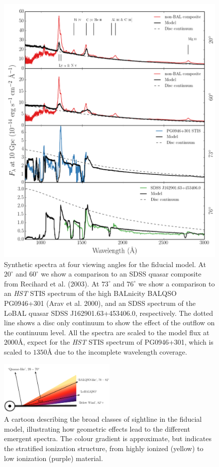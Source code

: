 \documentclass[useAMS,usenatbib]{mn2e_x}
\begin{document}
\begin{figure}
\centering
\includegraphics[width=1.0\textwidth]{figures/uvspec_new.png}
\caption
{
Synthetic spectra at four viewing angles for the fiducial model. At 
$20^\circ$ and $60^\circ$ we show a comparison to an SDSS quasar composite
from Recihard et al. (2003). At $73^\circ$ and $76^\circ$ we show a comparison to
an {\sl HST} STIS spectrum of the high BALnicity BALQSO 
PG0946+301 (Arav et al. 2000), and an SDSS spectrum of the LoBAL quasar 
SDSS J162901.63+453406.0, respectively. The dotted line shows a disc
only continuum to show the effect of the outflow on the continuum level. 
All the spectra are scaled to the model flux at $2000$\AA, expect for the 
{\sl HST} STIS spectrum of PG0946+301, which is scaled to $1350$\AA
due to the incomplete wavelength coverage.
}
\label{fig:uvspec}
\end{figure}

\begin{figure} 
\centering
\includegraphics[width=0.5\textwidth]{figures/windnew3.png}
\caption
{
A cartoon describing the broad classes of sightline 
in the fiducial model, illustrating how geometric effects lead to 
the different emergent spectra. The colour gradient is approximate,
but indicates the stratified ionization structure, 
from highly ionized (yellow) to low ionization (purple) material.
}
\label{fig:sightline}
\end{figure} 
\end{document}
